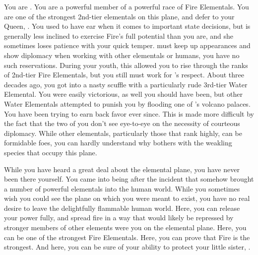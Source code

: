 \documentclass[char]{elementals}
\begin{document}
\name{\cPyro{}}

You are \cPyro{\intro}.  You are a powerful member of a powerful race of Fire Elementals.  You are one of the strongest 2nd-tier elementals on this plane, and defer to your Queen, \cQueen{\intro}.  You used to have \cQueen{\their} ear when it comes to important state decisions, but \cQueen{\they} is generally less inclined to exercise Fire's full potential than you are, and she sometimes loses patience with your quick temper.  \cQueen{\they} must keep up appearances and show diplomacy when working with other elementals or humans, you have no such reservations.  During your youth, this allowed you to rise through the ranks of 2nd-tier Fire Elementals, but you still must work for \cQueen{}'s respect.  About three decades ago, you got into a nasty scuffle with a particularly rude 3rd-tier Water Elemental.  You were easily victorious, as well you should have been, but other Water Elementals attempted to punish you by flooding one of \cQueen{}'s volcano palaces.  You have been trying to earn back \cQueen{\their} favor ever since.  This is made more difficult by the fact that the two of you don't see eye-to-eye on the necessity of courteous diplomacy.  While other elementals, particularly those that rank highly, can be formidable foes, you can hardly understand why \cQueen{} bothers with the weakling species that occupy this plane.

While you have heard a great deal about the elemental plane, you have never been there yourself.  You came into being after the incident that somehow brought a number of powerful elementals into the human world.  While you sometimes wish you could see the plane on which you were meant to exist, you have no real desire to leave the delightfully flammable human world.  Here, you can release your power fully, and spread fire in a way that would likely be repressed by stronger members of other elements were you on the elemental plane.  Here, you can be one of the strongest Fire Elementals.  Here, you can prove that Fire is the strongest.  And here, you can be sure of your ability to protect your little sister, \cJuliet{\intro}.
\end{document}
